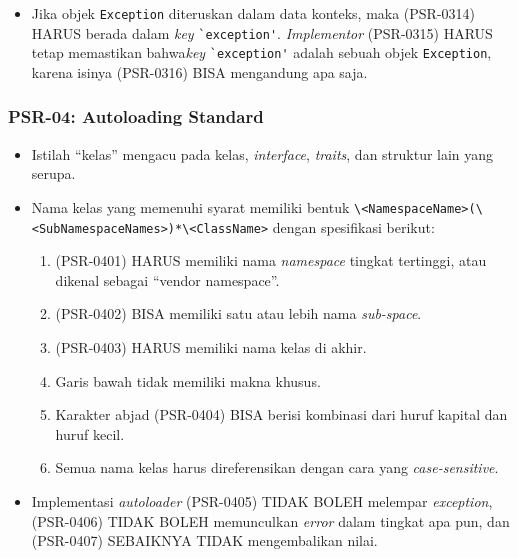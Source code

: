 \begin{itemize}
	\item Jika objek \verb|Exception| diteruskan dalam data konteks, maka (PSR-0314) HARUS berada dalam \textit{key} \verb|`exception'|. \textit{Implementor} (PSR-0315) HARUS tetap memastikan bahwa\textit{key} \verb|`exception'| adalah sebuah objek \verb|Exception|, karena isinya (PSR-0316) BISA mengandung apa saja.
\end{itemize}

\subsubsection{PSR-04: Autoloading Standard}
\label{subsubsec:psr04}
\begin{itemize}
	\item Istilah ``kelas'' mengacu pada kelas, \textit{interface}, \textit{traits}, dan struktur lain yang serupa.
	\item Nama kelas yang memenuhi syarat memiliki bentuk \verb|\<NamespaceName>(\<SubNamespaceNames>)*\<ClassName>| dengan spesifikasi berikut:
	\begin{enumerate}
		\item (PSR-0401) HARUS memiliki nama \textit{namespace} tingkat tertinggi, atau dikenal sebagai ``vendor namespace''.
		\item (PSR-0402) BISA memiliki satu atau lebih nama \textit{sub-space}.
		\item (PSR-0403) HARUS memiliki nama kelas di akhir.
		\item Garis bawah tidak memiliki makna khusus.
		\item Karakter abjad (PSR-0404) BISA berisi kombinasi dari huruf kapital dan huruf kecil.
		\item Semua nama kelas harus direferensikan dengan cara yang \textit{case-sensitive}.
	\end{enumerate}
	\item Implementasi \textit{autoloader} (PSR-0405) TIDAK BOLEH melempar \textit{exception}, (PSR-0406) TIDAK BOLEH memunculkan \textit{error} dalam tingkat apa pun, dan (PSR-0407) SEBAIKNYA TIDAK mengembalikan nilai. 
\end{itemize}

